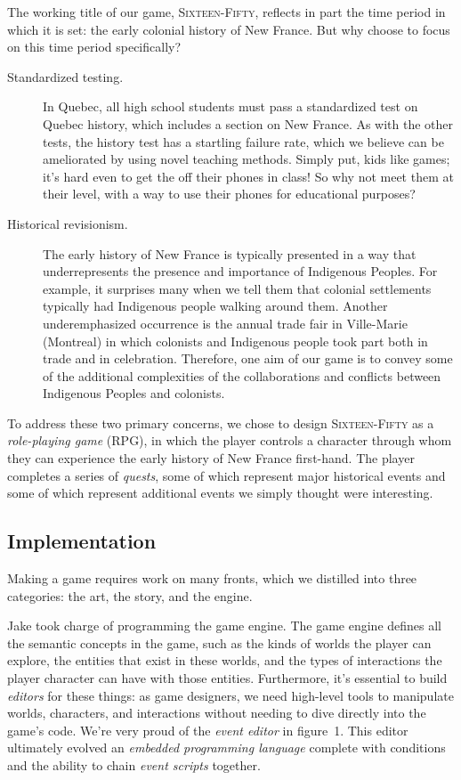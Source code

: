 \documentclass[11pt]{article}
\newcommand{\gametitle}{\textsc{Sixteen-Fifty}}
\begin{document}
The working title of our game, \gametitle, reflects in part the time period
in which it is set: the early colonial history of New France. But why choose to
focus on this time period specifically?
\begin{description}
  \item[Standardized testing.]
    In Quebec, all high school students must pass a standardized test on Quebec
    history, which includes a section on New France. As with the other tests,
    the history test has a startling failure rate, which we believe can be
    ameliorated by using novel teaching methods. Simply put, kids like games;
    it's hard even to get the off their phones in class! So why not meet them at
    their level, with a way to use their phones for educational purposes?
  \item[Historical revisionism.]
    The early history of New France is typically presented in a way that
    underrepresents the presence and importance of Indigenous Peoples.
    For example, it surprises many when we tell them that colonial settlements
    typically had Indigenous people walking around them. Another underemphasized
    occurrence is the annual trade fair in Ville-Marie (Montreal) in which
    colonists and Indigenous people took part both in trade and in celebration.
    Therefore, one aim of our game is to convey some of the additional
    complexities of the collaborations and conflicts between Indigenous Peoples
    and colonists.
\end{description}
%
To address these two primary concerns, we chose to design \gametitle{} as a
\emph{role-playing game} (RPG), in which the player controls a character through
whom they can experience the early history of New France first-hand.  The player
completes a series of \emph{quests}, some of which represent major historical
events and some of which represent additional events we simply thought were
interesting.

\subsection{Implementation}

Making a game requires work on many fronts, which we distilled into three
categories: the art, the story, and the engine.

Jake took charge of programming the game engine.
The game engine defines all the semantic concepts in the game,
such as the kinds of worlds the player can explore, the entities that exist in
these worlds, and the types of interactions the player character can have with
those entities. Furthermore, it's essential to build \emph{editors} for these
things: as game designers, we need high-level tools to manipulate worlds,
characters, and interactions without needing to dive directly into the game's
code. We're very proud of the \emph{event editor} in figure~1. This editor
ultimately evolved an \emph{embedded programming language} complete with
conditions and the ability to chain \emph{event scripts} together.
\end{document}
